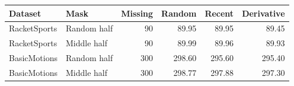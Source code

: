 \begin{tabular}{llrrrr}\toprule
Dataset & Mask & Missing & Random & Recent & Derivative \\ \midrule
RacketSports & Random half & 90 & 89.95 & 89.95 & 89.45 \\
RacketSports & Middle half & 90 & 89.99 & 89.96 & 89.93 \\
BasicMotions & Random half & 300 & 298.60 & 295.60 & 295.40 \\
BasicMotions & Middle half & 300 & 298.77 & 297.88 & 297.30 \\
\bottomrule\end{tabular}